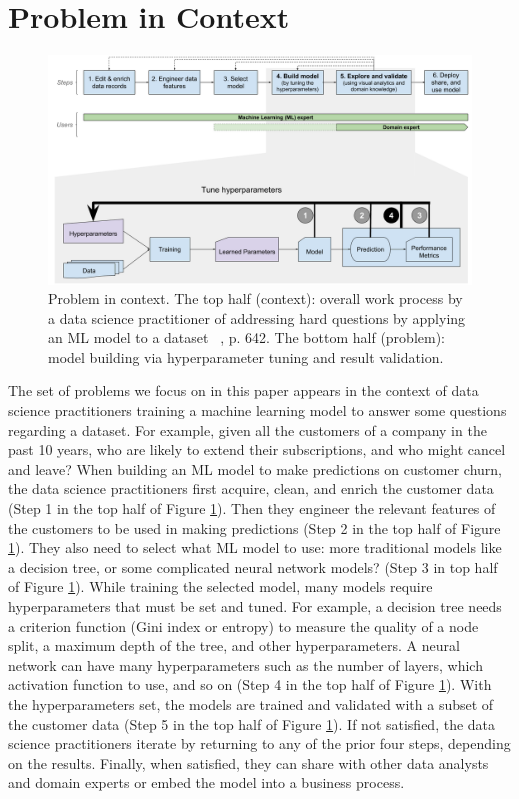 \documentclass[preprint]{vgtc}        %
\newcommand{\skye}[1]{{ #1}}
\begin{document}
\section{Problem in Context}
\begin{figure}[!ht]
 \includegraphics[width=\textwidth]{pictures/Figure1-Problem-In-Context}
 \caption{Problem in context. The top half (context): overall work process by a data science practitioner of addressing hard questions by applying an ML model to a dataset ~\cite{SachaHuman-CenteredChallenges}, p. 642. The bottom half (problem): model building via hyperparameter tuning and result validation.}
 \label{fig:Problem-In-Context}
\end{figure}
\skye{The set of problems we focus on in this paper appears in the context of data science practitioners training a machine learning model to answer some questions regarding a dataset. For example, given all the customers of a company in the past 10 years, who are likely to extend their subscriptions, and who might cancel and leave? When building an ML model to make predictions on customer churn, the data science practitioners first acquire, clean, and enrich the customer data (Step 1 in the top half of Figure \ref{fig:Problem-In-Context}). Then they engineer the relevant features of the customers to be used in making predictions (Step 2 in the top half of Figure \ref{fig:Problem-In-Context}). They also need to select what ML model to use: more traditional models like a decision tree, or some complicated neural network models? (Step 3 in top half of Figure \ref{fig:Problem-In-Context}). While training the selected model, many models require hyperparameters that must be set and tuned. For example, a decision tree needs a criterion function (Gini index or entropy) to measure the quality of a node split, a maximum depth of the tree, and other hyperparameters. A neural network can have many hyperparameters such as the number of layers, which activation function to use, and so on (Step 4 in the top half of Figure \ref{fig:Problem-In-Context}). With the hyperparameters set, the models are trained and validated with a subset of the customer data (Step 5 in the top half of Figure \ref{fig:Problem-In-Context})}. If not satisfied, the data science practitioners iterate by returning to any of the prior four steps, depending on the results. Finally, when satisfied, they can share with other data analysts and domain experts or embed the model into a business process.
\end{document}
